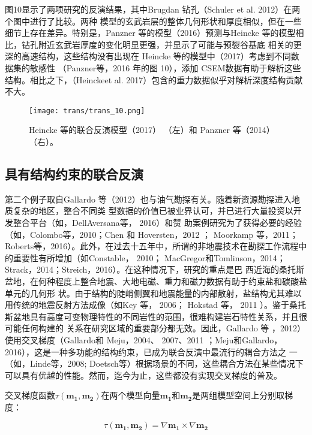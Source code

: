图10显示了两项研究的反演结果，其中Brugdan 钻孔（Schuler et al. 2012）在两个图中进行了比较。两种 模型的玄武岩层的整体几何形状和厚度相似，但在一些细节上存在差异。特别是，Panzner 等的模型（2016）预测与Heincke 等的模型相比，钻孔附近玄武岩厚度的变化明显更强，并显示了可能与预裂谷基底 相关的更深的高速结构，这些结构没有出现在 Heincke 等的模型中（2017）考虑到不同数据集的敏感性 （Panzner等，2016 年的图 10），添加 CSEM数据有助于解析这些结构。相比之下，（Heinckeet al. 2017）包含的重力数据似乎对解析深度结构贡献不大。

\begin{figure}[H]
    \centering
    \texttt{[image: trans/trans\_10.png]}
    \caption{Heincke 等的联合反演模型（2017） （左）和 Panzner 等（2014）（右）。}

\end{figure}

\subsection{具有结构约束的联合反演}

第二个例子取自Gallardo 等（2012）也与油气勘探有关。随着新资源勘探进入地质复杂的地区，整合不同类 型数据的价值已被业界认可，并已进行大量投资以开发整合平台（如，DellAversana等， 2016）和赞 助案例研究为了获得必要的经验（如，Colombo等，2010；Chen 和 Hoversten，2012 ； Moorkamp 等，2011； Roberts等，2016）。此外，在过去十五年中，所谓的非地震技术在勘探工作流程中的重要性有所增加（如Constable， 2010； MacGregor和Tomlinson，2014； Strack，2014；Streich，2016）。在这种情况下，研究的重点是巴 西近海的桑托斯盆地，在何种程度上整合地震、大地电磁、重力和磁力数据有助于约束盐和碳酸盐单元的几何形 状。由于结构的陡峭侧翼和地震能量的内部散射，盐结构尤其难以用传统的地震反射方法成像（如Key 等， 2006； Hokstad 等， 2011 ）。鉴于桑托斯盆地具有高度可变物理特性的不同岩性的范围，很难构建岩石特性关系，并且很可能任何构建的 关系在研究区域的重要部分都无效。因此，Gallardo 等 ，2012）使用交叉梯度（Gallardo和 Meju，2004、 2007、2011 ；Meju和Gallardo，2016），这是一种多功能的结构约束，已成为联合反演中最流行的耦合方法之 一（如，Linde等，2008; Doetsch等）根据场景的不同，这些耦合方法在某些情况下可以具有优越的性能。然而，迄今为止，这些都没有实现交叉梯度的普及。

交叉梯度函数$\tau(\mathbf{m_1}, \mathbf{m_2})$在两个模型向量$\mathbf{m_1}$和$\mathbf{m_2}$是两组模型空间上分别取梯度：

\begin{equation}
    \tau(\mathbf{m_1}, \mathbf{m_2}) = \nabla \mathbf{m_1}\times \nabla \mathbf{m_2}
\end{equation}


